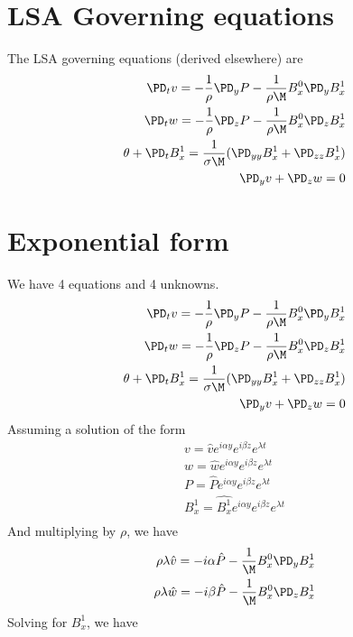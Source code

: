 \documentclass[11pt]{article}
\begin{document}
\doublespacing
\MOONSTITLE
\maketitle

\section{LSA Governing equations}

The LSA governing equations (derived elsewhere) are
\begin{equation}\begin{aligned}
\PD_t v = -\frac{1}{\rho}\PD_y P - \frac{1}{\rho \M} B_x^0 \PD_y B_x^{1} \\
\PD_t w = -\frac{1}{\rho}\PD_z P - \frac{1}{\rho \M} B_x^0 \PD_z B_x^{1} \\
\theta + \PD_t B_x^{1} = \frac{1}{\sigma \M} (\PD_{yy} B_x^{1}+\PD_{zz} B_x^{1}) \\
\PD_y v + \PD_z w = 0  \\
\end{aligned} \end{equation}

\section{Exponential form}
We have 4 equations and 4 unknowns.
\begin{equation}\begin{aligned}
\PD_t v = -\frac{1}{\rho}\PD_y P - \frac{1}{\rho \M} B_x^0 \PD_y B_x^{1} \\
\PD_t w = -\frac{1}{\rho}\PD_z P - \frac{1}{\rho \M} B_x^0 \PD_z B_x^{1} \\
\theta + \PD_t B_x^{1} = \frac{1}{\sigma \M} (\PD_{yy} B_x^{1}+\PD_{zz} B_x^{1}) \\
\PD_y v + \PD_z w = 0  \\
\end{aligned} \end{equation}
Assuming a solution of the form
\begin{equation}\begin{aligned}
v = \hat{v} e^{i\alpha y} e^{i\beta z} e^{\lambda t} \\
w = \hat{w} e^{i\alpha y} e^{i\beta z} e^{\lambda t} \\
P = \hat{P} e^{i\alpha y} e^{i\beta z} e^{\lambda t} \\
B_x^1 = \hat{B_x^1} e^{i\alpha y} e^{i\beta z} e^{\lambda t} \\
\end{aligned} \end{equation}
And multiplying by $\rho$, we have
\begin{equation}\begin{aligned}
\rho \lambda \hat{v} = -i \alpha \hat{P} - \frac{1}{\M} B_x^0 \PD_y B_x^{1} \\
\rho \lambda \hat{w} = -i \beta  \hat{P} - \frac{1}{\M} B_x^0 \PD_z B_x^{1} \\
\end{aligned} \end{equation}
Solving for $B_x^1$, we have
\end{document}
